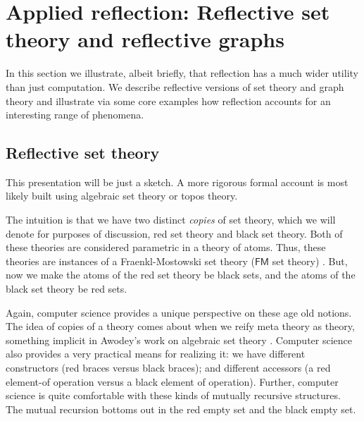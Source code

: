 \section{Applied reflection: Reflective set theory and reflective graphs}
In this section we illustrate, albeit briefly, that reflection has a
much wider utility than just computation. We describe reflective
versions of set theory and graph theory and illustrate via some core
examples how reflection accounts for an interesting range of phenomena.

\subsection{Reflective set theory}

This presentation will be just a sketch. A more rigorous formal
account is most likely built using algebraic set theory or topos theory.


The intuition is that we have two distinct \emph{copies} of set
theory, which we will denote for purposes of discussion, red set
theory and black set theory. Both of these theories are considered
parametric in a theory of atoms. Thus, these theories are instances of
a Fraenkl-Mostowski set theory ($\mathsf{FM}$ set theory)
\cite{DBLP:journals/tcs/Gabbay09}. But, now we make the atoms of the
red set theory be black sets, and the atoms of the black set theory be
red sets.

Again, computer science provides a unique perspective on these age old
notions. The idea of copies of a theory comes about when we reify meta
theory as theory, something implicit in Awodey's work on algebraic set
theory \cite{awodeysteven:algebraicsettheory2005}. Computer science
also provides a very practical means for realizing it: we have
different constructors (red braces versus black braces); and different
accessors (a red element-of operation versus a black element of
operation). Further, computer science is quite comfortable with these
kinds of mutually recursive structures. The mutual recursion bottoms
out in the red empty set and the black empty set.

